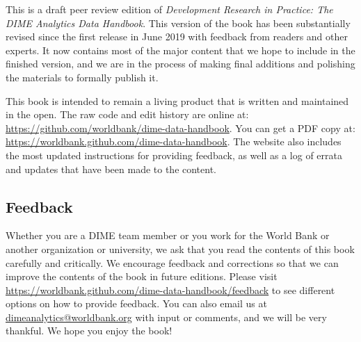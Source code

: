 This is a draft peer review edition of
\textit{Development Research in Practice:
The DIME Analytics Data Handbook}.
This version of the book has been substantially revised
since the first release in June 2019
with feedback from readers and other experts.
It now contains most of the major content
that we hope to include in the finished version,
and we are in the process of making final additions
and polishing the materials to formally publish it.

This book is intended to remain a living product
that is written and maintained in the open.
The raw code and edit history are online at:
\url{https://github.com/worldbank/dime-data-handbook}.
You can get a PDF copy at:
\url{https://worldbank.github.com/dime-data-handbook}.
The website also includes the most updated instructions
for providing feedback, as well as
a log of errata and updates that have been made to the content.

\subsection{Feedback}

Whether you are a DIME team member or you work for the World Bank
or another organization or university,
we ask that you read the contents of this book carefully and critically.
We encourage feedback and corrections
so that we can improve the contents of the book
in future editions. Please visit
\url{https://worldbank.github.com/dime-data-handbook/feedback} to
see different options on how to provide feedback.
You can also email us at \url{dimeanalytics@worldbank.org}
with input or comments, and we will be very thankful.
We hope you enjoy the book!
